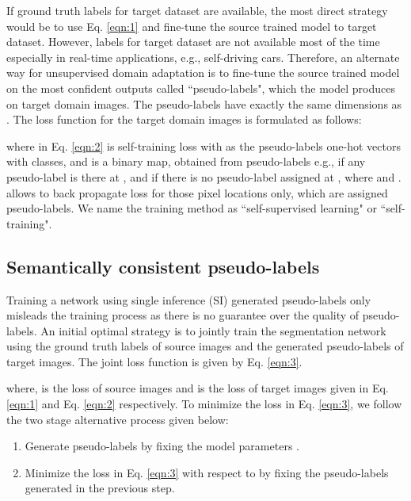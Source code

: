 \documentclass[10pt,twocolumn,letterpaper]{article}
\begin{document}
\vspace{-0.4cm}

If ground truth labels for target dataset are available, the most direct strategy would be to use Eq. \ref{eqn:1} and fine-tune the source trained model to target dataset. 
However, labels for target dataset are not available most of the time especially in real-time applications, e.g., self-driving cars. Therefore, an alternate way for unsupervised domain adaptation is to fine-tune the source trained model on the most confident outputs called ``pseudo-labels", which the model produces on target domain images. The pseudo-labels have exactly the same dimensions as . The loss function for the target domain images is formulated as follows:

where  in Eq. \ref{eqn:2} is self-training loss with  as the pseudo-labels one-hot vectors with  classes, and  is a binary map, obtained from pseudo-labels  e.g.,  if any pseudo-label is there at , and  if there is no pseudo-label assigned at , where  and .   allows to back propagate loss for those pixel locations only, which are assigned pseudo-labels. We name the training method as ``self-supervised learning" or ``self-training".

\subsection{Semantically consistent pseudo-labels}
\label{sec:sisc}
Training a network using single inference (SI) generated pseudo-labels only misleads the training process as there is no guarantee over the quality of pseudo-labels. An initial optimal strategy is to jointly train the segmentation network using the ground truth labels of source images and the generated pseudo-labels of target images. The joint loss function is given by Eq. \ref{eqn:3}.

where,  is the loss of source images  and  is the loss of target images  given in Eq. \ref{eqn:1} and Eq. \ref{eqn:2} respectively. To minimize the loss in Eq. \ref{eqn:3}, we follow the two stage alternative process given below: 
\begin{enumerate}
\item Generate pseudo-labels by fixing the model parameters .

\item Minimize the loss in Eq. \ref{eqn:3} with respect to  by fixing the pseudo-labels  generated in the previous step. 
\end{enumerate}
\end{document}
